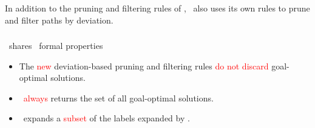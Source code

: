 \begin{frame}
\frametitle{\lexgo}	
	\begin{framed}
		\textcolor{ao}{In addition to the pruning and filtering rules of \namoa}, 
		\lexgo \ also uses its own rules to prune and filter paths by deviation.
	\end{framed}
\note{}
\end{frame}	
\begin{frame}
\frametitle{\lexgo}
	\begin{alertblock}{\lexgo \ shares \namoa \ formal properties}
		\begin{itemize}
		\vspace{2mm}
		\item The \textcolor{red}{new} deviation-based pruning and filtering rules \textcolor{red}{do not discard} goal-optimal solutions.
		\vspace{2mm}
 		\item \lexgo \ \textcolor{red}{always} returns the set of all goal-optimal solutions.
		\vspace{2mm}
 		\item \lexgo \ expands a \textcolor{red}{subset} of the labels expanded by \namoa.
 		\vspace{2mm}
		\end{itemize}
	\end{alertblock}
\note{}
\end{frame}
